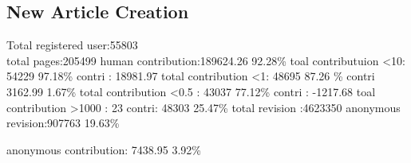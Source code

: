 \documentclass{elsarticle}
\begin{document}
\subsection{New Article Creation}
\label{sec:new-article-creation}



Total registered user:55803 \\

total pages:205499
human contribution:189624.26 92.28\%
toal contributuion <10: 54229  97.18\%  contri : 18981.97
total contribution <1: 48695 87.26 \%  contri 3162.99 1.67\%
total contribution <0.5 : 43037 77.12\%  contri : -1217.68
toal contribution >1000 : 23  contri: 48303 25.47\%
total revision :4623350
anonymous revision:907763 19.63\%

anonymous contribution: 7438.95 3.92\%


\end{document}
